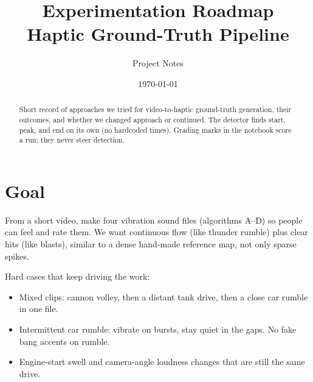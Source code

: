 \documentclass[11pt,a4paper]{article}
\title{Experimentation Roadmap\\
\large Haptic Ground-Truth Pipeline}
\author{Project Notes}
\date{\today}
\begin{document}
\maketitle

\begin{abstract}
\noindent
Short record of approaches we tried for video-to-haptic ground-truth generation,
their outcomes, and whether we changed approach or continued.
The detector finds start, peak, and end on its own (no hardcoded times).
Grading marks in the notebook score a run; they never steer detection.
\end{abstract}

\section{Goal}
From a short video, make four vibration sound files (algorithms A--D) so people can feel and rate them.
We want continuous flow (like thunder rumble) plus clear hits (like blasts), similar to a dense hand-made reference map, not only sparse spikes.

Hard cases that keep driving the work:
\begin{itemize}[leftmargin=*,itemsep=2pt]
  \item Mixed clips: cannon volley, then a distant tank drive, then a close car rumble in one file.
  \item Intermittent car rumble: vibrate on bursts, stay quiet in the gaps. No fake bang accents on rumble.
  \item Engine-start swell and camera-angle loudness changes that are still the same drive.
\end{itemize}
\end{document}
